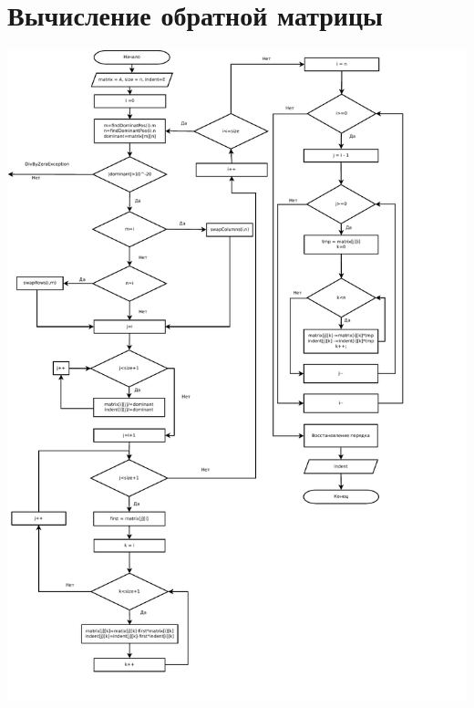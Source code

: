 \documentclass[a4paper,11pt]{article}
\begin{document}
\section*{Вычисление обратной матрицы}
\includegraphics[scale=0.75]{flowchart1.pdf}
\newpage
\end{document}
